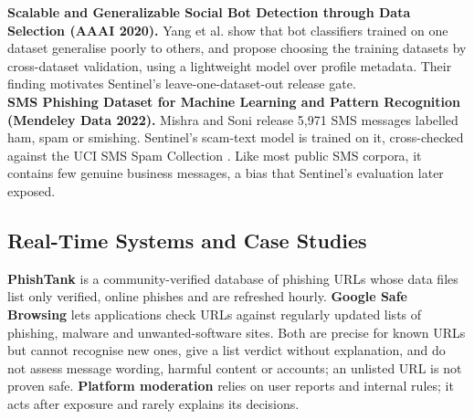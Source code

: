 \noindent\textbf{\cite{yang2020} Scalable and Generalizable Social Bot Detection through Data Selection (AAAI 2020).} Yang et al. show that bot classifiers trained on one dataset generalise poorly to others, and propose choosing the training datasets by cross-dataset validation, using a lightweight model over profile metadata. Their finding motivates Sentinel's leave-one-dataset-out release gate.\\

\noindent\textbf{\cite{smsdata} SMS Phishing Dataset for Machine Learning and Pattern Recognition (Mendeley Data 2022).} Mishra and Soni release 5,971 SMS messages labelled ham, spam or smishing. Sentinel's scam-text model is trained on it, cross-checked against the UCI SMS Spam Collection \cite{ucisms}. Like most public SMS corpora, it contains few genuine business messages, a bias that Sentinel's evaluation later exposed.

\subsection{Real-Time Systems and Case Studies}
\noindent\textbf{PhishTank} \cite{phishtank} is a community-verified database of phishing URLs whose data files list only verified, online phishes and are refreshed hourly. \textbf{Google Safe Browsing} \cite{safebrowsing} lets applications check URLs against regularly updated lists of phishing, malware and unwanted-software sites. Both are precise for known URLs but cannot recognise new ones, give a list verdict without explanation, and do not assess message wording, harmful content or accounts; an unlisted URL is not proven safe. \textbf{Platform moderation} relies on user reports and internal rules; it acts after exposure and rarely explains its decisions.


